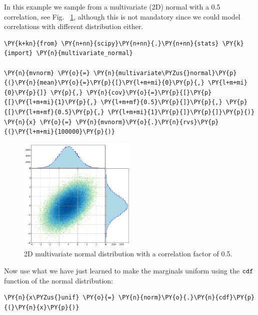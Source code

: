 In this example we sample from a multivariate (2D) normal with a 0.5 correlation, 
see Fig.~ \ref{fig:multivariate_with_correlation}, although this is not mandatory since
we could model correlations with different distribution either.

\begin{tcolorbox}[breakable, size=fbox, boxrule=1pt, pad at break*=1mm,colback=cellbackground, colframe=cellborder]
\begin{Verbatim}[commandchars=\\\{\}]
\PY{k+kn}{from} \PY{n+nn}{scipy}\PY{n+nn}{.}\PY{n+nn}{stats} \PY{k}{import} \PY{n}{multivariate_normal}

\PY{n}{mvnorm} \PY{o}{=} \PY{n}{multivariate\PYZus{}normal}\PY{p}{(}\PY{n}{mean}\PY{o}{=}\PY{p}{[}\PY{l+m+mi}{0}\PY{p}{,} \PY{l+m+mi}{0}\PY{p}{]} \PY{p}{,} \PY{n}{cov}\PY{o}{=}\PY{p}{[}\PY{p}{[}\PY{l+m+mi}{1}\PY{p}{,} \PY{l+m+mf}{0.5}\PY{p}{]}\PY{p}{,} \PY{p}{[}\PY{l+m+mf}{0.5}\PY{p}{,} \PY{l+m+mi}{1}\PY{p}{]}\PY{p}{]}\PY{p}{)}
\PY{n}{x} \PY{o}{=} \PY{n}{mvnorm}\PY{o}{.}\PY{n}{rvs}\PY{p}{(}\PY{l+m+mi}{100000}\PY{p}{)}
\end{Verbatim}
\end{tcolorbox}

\begin{figure}[hb]
  \centering
  \includegraphics[width=0.5\textwidth]{figures/lesson6_14_0.png}
  \caption{2D multivariate normal distribution with a correlation factor of 0.5.}
  \label{fig:multivariate_with_correlation}
\end{figure}
    
Now use what we have just learned to make the marginals uniform using
the \(\tt{cdf}\) function of the normal distribution:

\begin{tcolorbox}[breakable, size=fbox, boxrule=1pt, pad at break*=1mm,colback=cellbackground, colframe=cellborder]
\begin{Verbatim}[commandchars=\\\{\}]
\PY{n}{x\PYZus{}unif} \PY{o}{=} \PY{n}{norm}\PY{o}{.}\PY{n}{cdf}\PY{p}{(}\PY{n}{x}\PY{p}{)}
\end{Verbatim}
\end{tcolorbox}

